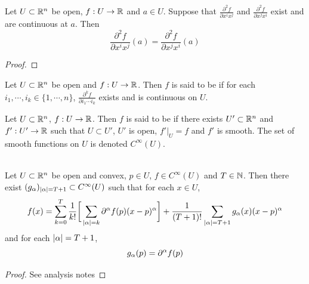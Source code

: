 \documentclass{book}
\begin{document}
	\begin{ex} 
		Let $U \subset \mathbb{R}^n$ be open, $f: U \rightarrow \mathbb{R}$ and $a \in U$. Suppose that $\frac{\partial ^2 f}{\partial x^i x^j}$ and $\frac{\partial ^2 f}{\partial x^j x^i}$ exist and are continuous at $a$. Then $$\frac{\partial ^2 f}{\partial x^i x^j} (a) = \frac{\partial ^2 f}{\partial x^j x^i} (a)$$
	\end{ex}

	\begin{proof}
		
	\end{proof}

	\begin{defn} 
		Let $U \subset \mathbb{R}^n$ be open and $f: U \rightarrow \mathbb{R}$. Then $f$ is said to be  if for each $i_1, \cdots, i_k \in \{1, \cdots, n\}$, $\frac{\partial^k f}{\partial i_1 \cdots i_k}$ exists and is continuous on $U$.
	\end{defn}

	\begin{defn} 
		Let $U \subset \mathbb{R}^n$, $f: U \rightarrow \mathbb{R}$. Then $f$ is said to be  if there exists $U' 
		\subset \mathbb{R}^n$ and $f':U' \rightarrow \mathbb{R}$ such that $U \subset U'$, $U'$ is open, $f'|_U = f$ and $f'$ is smooth. The set of smooth functions on $U$ is denoted $C^{\infty}(U)$.
	\end{defn}


	\begin{thm}  \\  
		Let $U \subset \mathbb{R}^n$ be open and convex, $p \in U$, $f \in C^{\infty}(U)$ and $T \in \mathbb{N}$. Then there exist $(g_{\alpha})_{|\alpha| = T+1} \subset C^{\infty}(U)$ such that for each $x \in U$, 
		$$f(x) = \sum_{k=0}^{T} \frac{1}{k!}\bigg[\sum_{|\alpha| = k} \partial^{\alpha} f (p) (x - p)^{\alpha}  \bigg] + \frac{1}{(T+1)!}\sum_{|\alpha| = T+1} g_{\alpha}(x) (x - p)^{\alpha} $$ and for each $|\alpha|= T+1$, $$g_{\alpha}(p) = \partial^{\alpha} f(p)$$
	\end{thm}
	
	\begin{proof}
	See analysis notes
	\end{proof}
\end{document}

